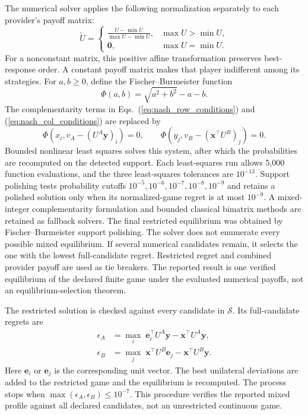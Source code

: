 \documentclass[11pt,a4paper]{article}
\newcommand{\Sset}{\mathcal{S}}
\begin{document}
The numerical solver applies the following normalization separately to each provider's payoff matrix:
\begin{equation}
\widetilde U=
\begin{cases}
\displaystyle\frac{U-\min U}{\max U-\min U}, & \max U>\min U,\\[6pt]
\boldsymbol 0, & \max U=\min U.
\end{cases}
\label{eq:payoff_normalization}
\end{equation}
For a nonconstant matrix, this positive affine transformation preserves best-response order. A constant payoff matrix makes that player indifferent among its strategies. For $a,b\ge0$, define the Fischer--Burmeister function \cite{fischer1992special}
\begin{equation}
\Phi(a,b)=\sqrt{a^2+b^2}-a-b.
\label{eq:fb_function}
\end{equation}
The complementarity terms in Eqs.~(\ref{eq:nash_row_conditions}) and (\ref{eq:nash_col_conditions}) are replaced by
\begin{equation}
\Phi\!\left(x_i,v_A-(U^A\boldsymbol y)_i\right)=0,
\qquad
\Phi\!\left(y_j,v_B-(\boldsymbol x^\top U^B)_j\right)=0.
\label{eq:fb_system}
\end{equation}
Bounded nonlinear least squares solves this system, after which the probabilities are recomputed on the detected support. Each least-squares run allows 5,000 function evaluations, and the three least-squares tolerances are $10^{-13}$. Support polishing tests probability cutoffs $10^{-5},10^{-6},10^{-7},10^{-8},10^{-9}$ and retains a polished solution only when its normalized-game regret is at most $10^{-9}$. A mixed-integer complementarity formulation and bounded classical bimatrix methods are retained as fallback solvers. The final restricted equilibrium was obtained by Fischer--Burmeister support polishing. The solver does not enumerate every possible mixed equilibrium. If several numerical candidates remain, it selects the one with the lowest full-candidate regret. Restricted regret and combined provider payoff are used as tie breakers. The reported result is one verified equilibrium of the declared finite game under the evaluated numerical payoffs, not an equilibrium-selection theorem.

The restricted solution is checked against every candidate in $\Sset$. Its full-candidate regrets are
\begin{align}
\epsilon_A&=\max_i\;\boldsymbol e_i^\top U^A\boldsymbol y
-\boldsymbol x^\top U^A\boldsymbol y,\label{eq:row_regret}\\
\epsilon_B&=\max_j\;\boldsymbol x^\top U^B\boldsymbol e_j
-\boldsymbol x^\top U^B\boldsymbol y.\label{eq:col_regret}
\end{align}
Here $\boldsymbol e_i$ or $\boldsymbol e_j$ is the corresponding unit vector. The best unilateral deviations are added to the restricted game and the equilibrium is recomputed. The process stops when $\max(\epsilon_A,\epsilon_B)\le10^{-7}$. This procedure verifies the reported mixed profile against all declared candidates, not an unrestricted continuous game.
\end{document}
